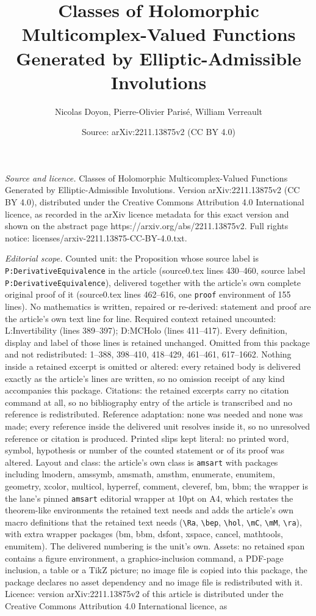 \documentclass[10pt,a4paper]{amsart}
\title[Classes of Holomorphic Multicomplex-Valued Functions Generat]{Classes of Holomorphic Multicomplex-Valued Functions Generated by Elliptic-Admissible Involutions}
\author{Nicolas Doyon, Pierre-Olivier Paris\'e, William Verreault}
\date{Source: arXiv:2211.13875v2 (CC BY 4.0)}
\begin{document}
\maketitle

\noindent\emph{Source and licence.} Classes of Holomorphic Multicomplex-Valued Functions Generated by Elliptic-Admissible Involutions. Version arXiv:2211.13875v2 (CC BY 4.0), distributed under the Creative Commons Attribution 4.0 International licence, as recorded in the arXiv licence metadata for this exact version and shown on the abstract page https://arxiv.org/abs/2211.13875v2. Full rights notice: licenses/arxiv-2211.13875-CC-BY-4.0.txt.\par\smallskip

\noindent\textit{Editorial scope.} Counted unit: the Proposition whose source label is \texttt{P:DerivativeEquivalence} in the article (source0.tex lines 430--460, source label \texttt{P:DerivativeEquivalence}), delivered together with the article's own complete original proof of it (source0.tex lines 462--616, one \texttt{proof} environment of 155 lines). No mathematics is written, repaired or re-derived: statement and proof are the article's own text line for line. Required context retained uncounted: L:Invertibility (lines 389--397); D:MCHolo (lines 411--417). Every definition, display and label of those lines is retained unchanged. Omitted from this package and not redistributed: 1--388, 398--410, 418--429, 461--461, 617--1662. Nothing inside a retained excerpt is omitted or altered: every retained body is delivered exactly as the article's lines are written, so no omission receipt of any kind accompanies this package. Citations: the retained excerpts carry no citation command at all, so no bibliography entry of the article is transcribed and no reference is redistributed. Reference adaptation: none was needed and none was made; every reference inside the delivered unit resolves inside it, so no unresolved reference or citation is produced. Printed slips kept literal: no printed word, symbol, hypothesis or number of the counted statement or of its proof was altered. Layout and class: the article's own class is \texttt{amsart} with packages including lmodern, amssymb, amsmath, amsthm, enumerate, enumitem, geometry, xcolor, multicol, hyperref, comment, cleveref, bm, bbm; the wrapper is the lane's pinned \texttt{amsart} editorial wrapper at 10pt on A4, which restates the theorem-like environments the retained text needs and adds the article's own macro definitions that the retained text needs (\texttt{\textbackslash Ra}, \texttt{\textbackslash bep}, \texttt{\textbackslash hol}, \texttt{\textbackslash mC}, \texttt{\textbackslash mM}, \texttt{\textbackslash ra}), with extra wrapper packages (bm, bbm, dsfont, xspace, cancel, mathtools, enumitem). The delivered numbering is the unit's own. Assets: no retained span contains a figure environment, a graphics-inclusion command, a PDF-page inclusion, a table or a TikZ picture; no image file is copied into this package, the package declares no asset dependency and no image file is redistributed with it. Licence: version arXiv:2211.13875v2 of this article is distributed under the Creative Commons Attribution 4.0 International licence, as 
\end{document}
